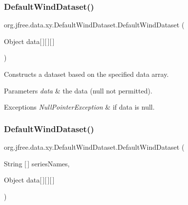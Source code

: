 \subsubsection{\texorpdfstring{Default\+Wind\+Dataset()}{DefaultWindDataset()}\hspace{0.1cm}{\footnotesize\ttfamily [2/4]}}
{\footnotesize\ttfamily org.\+jfree.\+data.\+xy.\+Default\+Wind\+Dataset.\+Default\+Wind\+Dataset (\begin{DoxyParamCaption}\item[{Object}]{data\mbox{[}$\,$\mbox{]}\mbox{[}$\,$\mbox{]}\mbox{[}$\,$\mbox{]} }\end{DoxyParamCaption})}

Constructs a dataset based on the specified data array.


\begin{DoxyParams}{Parameters}
{\em data} & the data ({\ttfamily null} not permitted).\\
\hline
\end{DoxyParams}

\begin{DoxyExceptions}{Exceptions}
{\em Null\+Pointer\+Exception} & if {\ttfamily data} is {\ttfamily null}. \\
\hline
\end{DoxyExceptions}
\mbox{\label{classorg_1_1jfree_1_1data_1_1xy_1_1_default_wind_dataset_a6f727603c8de64f0e6a3af3798abaa2f}} 
\subsubsection{\texorpdfstring{Default\+Wind\+Dataset()}{DefaultWindDataset()}\hspace{0.1cm}{\footnotesize\ttfamily [3/4]}}
{\footnotesize\ttfamily org.\+jfree.\+data.\+xy.\+Default\+Wind\+Dataset.\+Default\+Wind\+Dataset (\begin{DoxyParamCaption}\item[{String \mbox{[}$\,$\mbox{]}}]{series\+Names,  }\item[{Object}]{data\mbox{[}$\,$\mbox{]}\mbox{[}$\,$\mbox{]}\mbox{[}$\,$\mbox{]} }\end{DoxyParamCaption})}

